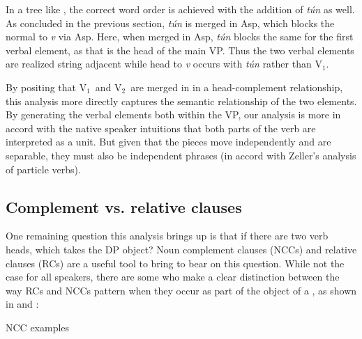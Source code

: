 \documentclass[output=paper,newtxmath,modfonts,nonflat,draftmode]{langsci/langscibook}
\begin{document}
In a tree like , the correct word order is achieved with the addition of \textit{tún} as well. As concluded in the previous section, \textit{tún} is merged in Asp, which blocks the normal  to \textit{v} via Asp. Here, when merged in Asp, \textit{tún} blocks the same  for the first verbal element, as that is the head of the main VP. Thus the two verbal elements are realized string adjacent while head  to \textit{v} occurs with \textit{tún} rather than V$_{1}$.

By positing that V$_{1}$\ and V$_{2}$\ are merged in in a head-complement relationship, this analysis more directly captures the semantic relationship of the two elements. By generating the verbal elements both within the VP, our analysis is more in accord with the native speaker intuitions that both parts of the verb are interpreted as a unit. But given that the pieces move independently and are separable, they must also be independent phrases (in accord with Zeller's analysis of particle verbs).


\subsection{Complement vs. relative clauses}
One remaining question this analysis brings up is that if there are two verb heads, which takes the DP object? Noun complement clauses (NCCs) and relative clauses (RCs) are a useful tool to bring to bear on this question. While not the case for all speakers, there are some who make a clear distinction between the way RCs and NCCs pattern when they occur as part of the object of a , as shown in  and :

\pagebreak

\ea NCC examples

\z 
\label{ex:parrish:believe-story}
\z
\end{document}

